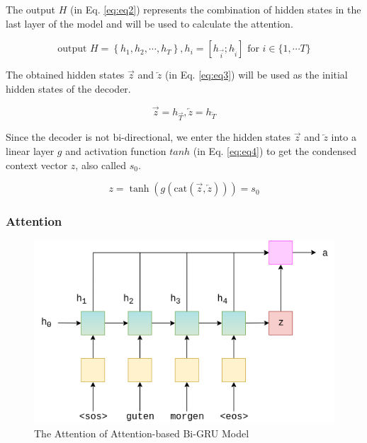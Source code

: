 The output $H$ (in Eq. \ref{eq:eq2}) represents the combination of hidden states in the last layer of the model and will be used to calculate the attention. 

\begin{equation}
    \text{output  } H = \left\{h_1, h_2, \cdots, h_T\right\}, h_i = [h_{\overrightarrow{i}}; h_{\overleftarrow{i}}] \text{ for } i \in \{1,\cdots T\}
    \label{eq:eq2}
\end{equation}

The obtained hidden states $\overrightarrow{z}$ and $\overleftarrow{z}$ (in Eq. \ref{eq:eq3}) will be used as the initial hidden states of the decoder. 

\begin{equation}
    \overrightarrow{z} = h_{\overrightarrow{T}},
    \overleftarrow{z} = h_{\overleftarrow{T}}
    \label{eq:eq3}
\end{equation}

Since the decoder is not bi-directional, we enter the hidden states $\overrightarrow{z}$ and $\overleftarrow{z}$ into a linear layer $g$ and activation function $tanh$ (in Eq. \ref{eq:eq4}) to get the condensed context vector $z$, also called $s_0$.

\begin{equation}
    z = \tanh(g(\text{cat}(\overrightarrow{z}, \overleftarrow{z}))) = s_0
    \label{eq:eq4}
\end{equation}

\subsubsection{Attention}

\begin{figure}[h]
	\centering
	\includegraphics[scale=0.7]{../images/seq2seq_encoder_attention.png}
    \caption{The Attention of Attention-based Bi-GRU Model}
	\label{fig:seq2seq_attention}
\end{figure}

